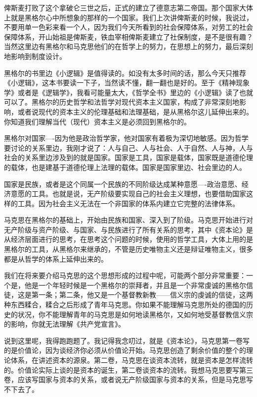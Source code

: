 \documentclass[UTF8, 12pt, a4paper]{ctexrep}
\begin{document}
俾斯麦打败了这个拿破仑三世之后，正式的建立了德意志第二帝国。那个国家大体上就是黑格尔心中所想象的那样的一个国家。我们上次讲俾斯麦的时候，我说过，不要用单一色彩来看一个人，因为我们今天所看到的社会保障体系，对劳工的社会保障体系，开山始祖是俾斯麦，铁血宰相俾斯麦建立了社保制度，是不是很有趣？当然这里边有黑格尔和马克思他们的在哲学上的努力，在思想上的努力，最后深刻地影响到制度设计。

黑格尔的书里边《小逻辑》是值得读的。如没有太多时间的话，那么今天只推荐《小逻辑》，这本书要读一下子，当然读不懂，翻一翻也是好的。至于《精神现象学》或者是《逻辑学》，我看可能量太大，《哲学全书》里边的《小逻辑》读了也就可以了。黑格尔的历史哲学和法哲学对现代资本主义国家，构成了非常深刻地影响，或者说现代的资本主义的伦理基础和法理基础，是从黑格尔这儿延伸出来的。你知道我们理解当代（现代）资本主义是必须回到黑格尔的。

黑格尔对国家----因为他是政治哲学家，他对国家有着极为深切地敏感。因为哲学要讨论的关系里边，我刚才说了：人与自己、人与社会、人于自然、人与神，人与社会的关系里边涉及到的就是国家。国家是工具，国家是载体，国家既是道德伦理的载体，也是建基于道德伦理上法理的载体。国家是国家里边、社会里边的人。

国家是民族，或者是这个同属一个民族的不同阶级达成某种意愿----政治意愿、经济意愿的工具。也就是说，无产阶级要实现自己的社会主义理想，也要借助国家这样的工具。因为社会主义无法在一个非国家的体系内建立它完整的法律体系。

马克思在黑格尔的基础上，开始由民族和国家、深入到了阶级。马克思开始进行对无产阶级与资产阶级、与国家、与民族进行了所有关系的思考，其中《资本论》是从经济层面进行的思考，在思考这个问题的时候，使用的哲学工具，大体上用的是黑格尔的工具，从黑格尔来继承的，不管是历史唯物主义还是辩证唯物主义，很多都是从哲学的体系上延伸出来的。

我们在将来要介绍马克思的这个思想形成的过程中呢，可能两个部分非常重要：一个是，他是一个年轻时候是一个黑格尔的崇拜者，并且是一个非常虔诚的黑格尔信徒，这是第一条；第二条，他又是一个基督教新教——信义宗的虔诚的信徒，这两种东西糅合，糅合之后形成了青年马克思。你如果不能理解马克思所处的德国的历史的状况，你不能理解青年的马克思是如何地读黑格尔，又如何地受基督教信义宗的影响，你就无法理解《共产党宣言》。

说到这里呢，我得跑跑题了。我记得我念叨过，就是《资本论》，马克思第一卷写的是价值论，因为谈经济你必须从价值论开始。马克思创造了剩余价值的整个的理论体系，在讲述资本的源泉。第二卷，马克思在谈资本流转，就是资本是怎样流转的。价值论实际上谈的是资本的诞生，第二卷谈资本的流转。我想马克思要写第三卷，应该写国家与资本的关系，或者说无产阶级国家与资本的关系，但是马克思写不下去了。
\end{document}
